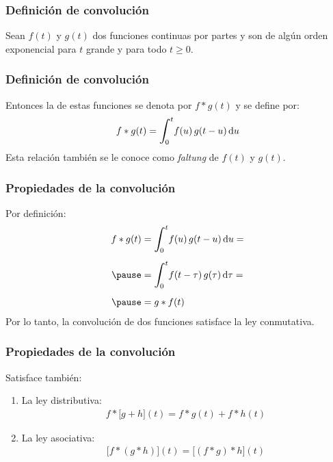 \begin{frame}
\frametitle{Definición de convolución}
Sean $f (t)$ y $g (t)$ dos funciones continuas por partes y son de algún orden exponencial para $t$ grande y para todo $t \geq 0$.
\end{frame}
\begin{frame}
\frametitle{Definición de convolución}
Entonces la  de estas funciones se denota por $f * g (t)$ y se define por:
\pause
\begin{align}
f * g (t) = \scaleint{6ex}_{\bs 0}^{t} f (u) \, g (t - u) \dd{u}
\label{03_55}
\end{align}
Esta relación también se le conoce como \emph{faltung} de $f (t)$ y $g (t)$.
\end{frame}
\begin{frame}
\frametitle{Propiedades de la convolución}
Por definición:
\pause
\begin{eqnarray}
\begin{aligned}
f * g (t) &= \scaleint{6ex}_{\bs 0}^{t} f (u) \, g (t - u) \dd{u} = \\[0.5em] \pause
&= \scaleint{6ex}_{\bs 0}^{t} f (t - \tau) \, g (\tau) \dd{\tau} = \\[0.5em] \pause
&= g * f (t)
\end{aligned}
\label{eq:ecuacion_03_56}
\end{eqnarray}
\pause
Por lo tanto, la convolución de dos funciones satisface la ley conmutativa.
\end{frame}
\begin{frame}
\frametitle{Propiedades de la convolución}
Satisface también:
\pause
{}
\begin{enumerate}[<+->]
\item La ley distributiva:
\begin{align}
f * \big[  g + h  \big](t) = f * g (t) + f * h (t)
\label{eq:ecuacion_03_57}
\end{align}
\item La ley asociativa:
\begin{align}
\big[  f * (g * h)  \big](t) = \big[  (f * g) * h  \big] (t)
\label{eq:ecuacion_03_58}
\end{align}
\end{enumerate}
\end{frame}
